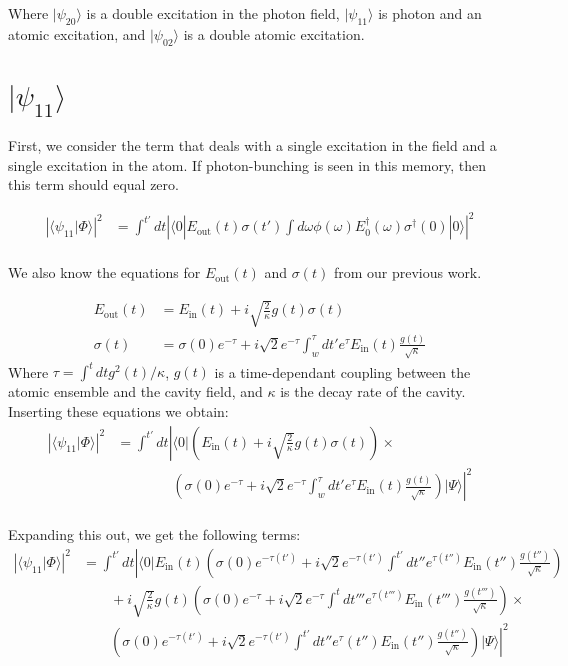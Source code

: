 \documentclass[12pt]{article}
\begin{document}
Where $| \psi_{20} \rangle$ is a double excitation in the photon field, $| \psi_{11} \rangle $ is photon and an atomic excitation, and $ | \psi_{02} \rangle $ is a double atomic excitation. 
\section{$| \psi_{11} \rangle$}
First, we consider the term that deals with a single excitation in the field and a single
excitation in the atom. If photon-bunching is seen in this memory, then this term should
equal zero.

\begin{align}
\left | \langle \psi_{11} | \Phi \rangle \right | ^2 &=\int^{t'} dt \left | \langle 0 | E_\textrm{out}(t) \sigma(t') \int d \omega \phi(\omega)E^\dagger_0(\omega)
\sigma^\dagger(0) | 0 \rangle \right |^2 \\
\end{align}


We also know the equations for $E_\text{out} (t)$ and $\sigma (t)$ from our previous work.

\begin{align}
E_\textrm{out}(t) &= E_\textrm{in}(t) + i \sqrt{\frac{2}{\kappa}} g(t) \sigma(t)\\
\sigma(t) &= \sigma(0) e^{-\tau} + i\sqrt{2} e^{-\tau} \int^\tau_w d t' e^\tau E_\textrm{in}(t) \frac{g(t)}{\sqrt{\kappa}}
\end{align}
Where $\tau = \int^t dt g^2(t)/\kappa$, $g(t)$ is a time-dependant coupling between the atomic ensemble and the cavity field, and $\kappa$ is the decay rate of the cavity. Inserting these equations we obtain:
\begin{align}
\left | \langle \psi_{11} | \Phi \rangle \right | ^2 &= \int^{t'} dt \left | \langle 0 |
   \left(  E_\textrm{in}(t) + i \sqrt{\frac{2}{\kappa}} g(t) \sigma(t) \right ) \times \right.\\
   &\left. \qquad \qquad \left (\sigma(0) e^{-\tau} + i\sqrt{2} e^{-\tau} \int^\tau_w d t' e^\tau E_\textrm{in}(t) \frac{g(t)}{\sqrt{\kappa}}\right)|\Psi \rangle \right |^2\\
\end{align}

Expanding this out, we get the following terms:
\begin{align}
\left | \langle \psi_{11} | \Phi \rangle \right | ^2 &= 
\int^{t'} dt \left | \langle 0 | E_\textrm{in}(t) \left( \sigma(0) e^{-\tau(t')} + i\sqrt{2} e^{-\tau(t')} \int^{t'} d t'' e^{\tau(t'')} E_\textrm{in}(t'') \frac{g(t'')}{\sqrt{\kappa}} \right )\right. \\
&\qquad+ i \sqrt{\frac{2}{\kappa}}g(t)\left (\sigma(0) e^{-\tau} + i\sqrt{2} e^{-\tau} \int^{t}d t''' e^{\tau(t''')} E_\textrm{in}(t''') \frac{g(t''')}{\sqrt{\kappa}} \right) \times\\
&\left.\qquad \left(\sigma(0) e^{-\tau(t')} + i\sqrt{2} e^{-\tau(t')} \int^{t'} d t'' e^\tau(t'') E_\textrm{in}(t'') \frac{g(t'')}{\sqrt{\kappa}}\right) | \Psi \rangle \right |^2 
\end{align}
\end{document}
